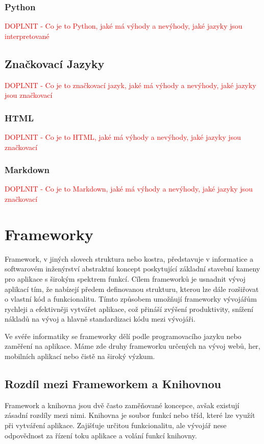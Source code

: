 \subsubsection{Python}
\label{subsubsec:languages-interpreted-python}
\textcolor{red}{DOPLNIT - Co je to Python, jaké má výhody a nevýhody, jaké jazyky jsou interpretované}

\subsection{Značkovací Jazyky}
\label{subsec:languages-markup}
\textcolor{red}{DOPLNIT - Co je to značkovací jazyk, jaké má výhody a nevýhody, jaké jazyky jsou značkovací}

\subsubsection{HTML}
\label{subsubsec:languages-markup-html}
\textcolor{red}{DOPLNIT - Co je to HTML, jaké má výhody a nevýhody, jaké jazyky jsou značkovací}

\subsubsection{Markdown}
\label{subsubsec:languages-markup-markdown}
\textcolor{red}{DOPLNIT - Co je to Markdown, jaké má výhody a nevýhody, jaké jazyky jsou značkovací}

\section{Frameworky}
\label{sec:dev-framework}
Framework, v jiných slovech struktura nebo kostra, představuje v informatice a softwarovém inženýrství abstraktní koncept poskytující základní stavební kameny pro aplikace s širokým spektrem funkcí. Cílem frameworků je usnadnit vývoj aplikací tím, že nabízejí předem definovanou strukturu, kterou lze dále rozšiřovat o vlastní kód a funkcionalitu. Tímto způsobem umožňují frameworky vývojářům rychleji a efektivněji vytvářet aplikace, což přináší zvýšení produktivity, snížení nákladů na vývoj a hlavně standardizaci kódu mezi vývojáři.

Ve svéře informatiky se frameworky dělí podle programovacího jazyku nebo zaměření na aplikace. Máme zde druhy frameworku určených na vývoj webů, her, mobilních aplikací nebo čistě na široký výzkum. \cite{about_framework}

\subsection*{Rozdíl mezi Frameworkem a Knihovnou}
Framework a knihovna jsou dvě často zaměňované koncepce, avšak existují zásadní rozdíly mezi nimi. Knihovna je soubor funkcí nebo tříd, které lze využít při vytváření aplikace. Zajišťuje určitou funkcionalitu, ale vývojář nese odpovědnost za řízení toku aplikace a volání funkcí knihovny.


